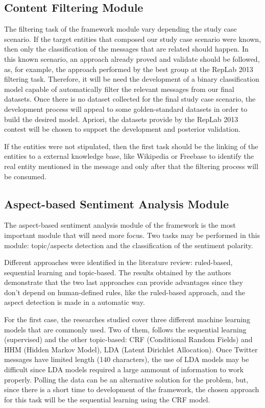 \subsection{Content Filtering Module}
The filtering task of the framework module vary depending the study case scenario. If the target entities that composed our study case scenario were known, then only the classification of the messages that are related should happen. In this known scenario, an approach already proved and validate should be followed, as, for example, the approach performed by the best group at the RepLab 2013 filtering task. Therefore, it will be need the development  of a binary classification model capable of automatically filter the relevant messages from our final datasets. Once there is no dataset collected for the final study case scenario, the development process will appeal to some golden-standard datasets in order to build the desired model. Apriori, the datasets provide by the RepLab 2013 contest will be chosen to support the development and posterior validation.

If the entities were not stipulated, then the first task should be the linking of the entities to a external knowledge base, like Wikipedia or Freebase to identify the real entity mentioned in the message and only after that the filtering process will be consumed.

\subsection{Aspect-based Sentiment Analysis Module}

The aspect-based sentiment analysis module of the framework is the most important module that will need more focus. Two tasks may be performed in this module: topic/aspects detection and the classification of the sentiment polarity.

Different approaches were identified in the literature review: ruled-based, sequential learning and topic-based. The results obtained by the authors demonstrate that the two last approaches can provide advantages since they don't depend on human-defined rules, like the ruled-based approach, and the aspect detection is made in a automatic way.

For the first case, the researches studied cover three different machine learning models that are commonly used. Two of them, follows the sequential learning (supervised) and the other topic-based: CRF (Conditional Random Fields) and HHM (Hidden Markov Model), LDA (Latent Dirichlet Allocation).
Once Twitter messages have limited length (140 characters), the use of LDA models may be difficult since LDA models required a large ammount of information to work properly. Polling the data can be an alternative solution for the problem, but, since there is a short time to development of the framework, the chosen approach for this task will be the sequential learning using the CRF model.

